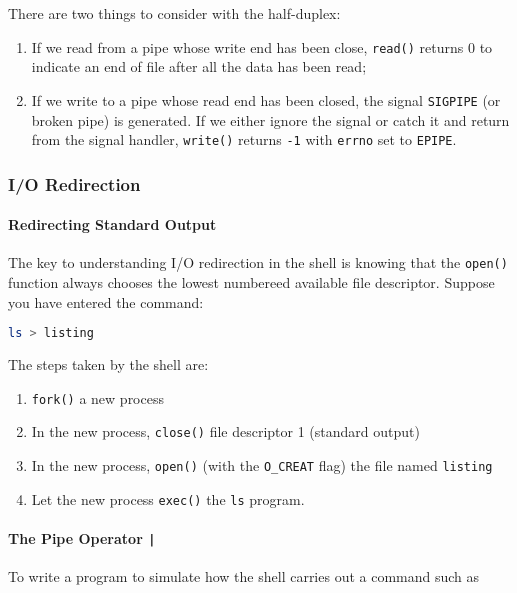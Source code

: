 \documentclass{article}
\newcommand{\code}[1]{\texttt{#1}}
\begin{document}
\noindent There are two things to consider with the half-duplex:

\begin{enumerate}
    \item If we read from a pipe whose write end has been close, \code{read()} returns 0 to indicate an end of file after all the data has been read;
    \item If we write to a pipe whose read end has been closed, the signal \code{SIGPIPE} (or broken pipe) is generated. If we either ignore the signal or catch it and return from the signal handler, \code{write()} returns \code{-1} with \code{errno} set to \code{EPIPE}. 
\end{enumerate}

\subsubsection{I/O Redirection}

\paragraph{Redirecting Standard Output}

The key to understanding I/O redirection in the shell is knowing that the \code{open()} function always chooses the lowest numbereed available file descriptor. Suppose you have entered the command: 

\begin{lstlisting}[language=bash]
ls > listing
\end{lstlisting}

\noindent The steps taken by the shell are:

\begin{enumerate}
    \item \code{fork()} a new process
    \item In the new process, \code{close()} file descriptor 1 (standard output)
    \item In the new process, \code{open()} (with the \code{O\_CREAT} flag) the file named \code{listing}
    \item Let the new process \code{exec()} the \code{ls} program. 
\end{enumerate}

\paragraph{The Pipe Operator \code{|}}

To write a program to simulate how the shell carries out a command such as 
\end{document}

